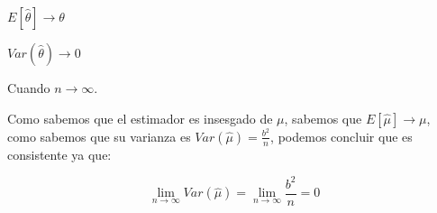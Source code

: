 \documentclass[a4paper, 10pt]{article} %
\begin{document}
		\begin{description}
			\item $E[\hat{\theta}] \rightarrow \theta$
			\item $Var(\hat{\theta}) \rightarrow 0$
		\end{description}
		Cuando $n \rightarrow \infty$.
	
		Como sabemos que el estimador es insesgado de $\mu$, sabemos que $E[\hat{\mu}] \rightarrow \mu$, como sabemos que su
		varianza es $Var(\hat{\mu}) = \frac{b^2}{n}$, podemos concluir que es consistente ya que:
	
		$$\lim\limits_{n \rightarrow \infty} Var(\hat{\mu}) = \lim\limits_{n \rightarrow \infty} \frac{b^2}{n} = 0$$
\end{document}
